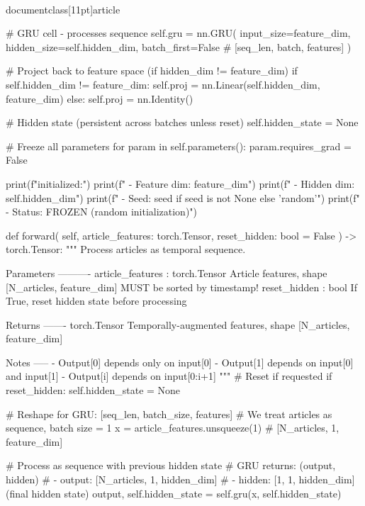 \\documentclass[11pt]{article}
\begin{document}
\begin{CodeBlock}
        # GRU cell - processes sequence
        self.gru = nn.GRU(
            input_size=feature_dim,
            hidden_size=self.hidden_dim,
            batch_first=False  # [seq_len, batch, features]
        )
        
        # Project back to feature space (if hidden_dim != feature_dim)
        if self.hidden_dim != feature_dim:
            self.proj = nn.Linear(self.hidden_dim, feature_dim)
        else:
            self.proj = nn.Identity()
        
        # Hidden state (persistent across batches unless reset)
        self.hidden_state = None
        
        # Freeze all parameters
        for param in self.parameters():
            param.requires_grad = False
        
        print(f"\nTemporalGRU initialized:")
        print(f"  - Feature dim: {feature_dim}")
        print(f"  - Hidden dim: {self.hidden_dim}")
        print(f"  - Seed: {seed if seed is not None else 'random'}")
        print(f"  - Status: FROZEN (random initialization)")
    
    def forward(
        self,
        article_features: torch.Tensor,
        reset_hidden: bool = False
    ) -> torch.Tensor:
        """
        Process articles as temporal sequence.
        
        Parameters
        ----------
        article_features : torch.Tensor
            Article features, shape [N_articles, feature_dim]
            MUST be sorted by timestamp!
        reset_hidden : bool
            If True, reset hidden state before processing
        
        Returns
        -------
        torch.Tensor
            Temporally-augmented features, shape [N_articles, feature_dim]
            
        Notes
        -----
        - Output[0] depends only on input[0]
        - Output[1] depends on input[0] and input[1]
        - Output[i] depends on input[0:i+1]
        """
        # Reset if requested
        if reset_hidden:
            self.hidden_state = None
        
        # Reshape for GRU: [seq_len, batch_size, features]
        # We treat articles as sequence, batch size = 1
        x = article_features.unsqueeze(1)  # [N_articles, 1, feature_dim]
        
        # Process as sequence with previous hidden state
        # GRU returns: (output, hidden)
        # - output: [N_articles, 1, hidden_dim]
        # - hidden: [1, 1, hidden_dim] (final hidden state)
        output, self.hidden_state = self.gru(x, self.hidden_state)
        

\end{CodeBlock}
\end{document}
